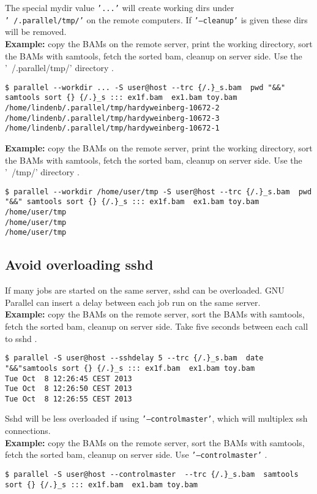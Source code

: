 \documentclass{article}
\newcommand{\example}[1]{
\textbf{Example: } {\color[rgb]{0,0,1} #1 } .
}
\newcommand{\cmdoption}[1]{\texttt{'#1'}}
\begin{document}
The special mydir value \cmdoption{...} will create working dirs under \cmdoption{~/.parallel/tmp/} on the remote computers. If \cmdoption{--cleanup} is given these dirs will be removed.\\

\example{copy the BAMs on the remote server, print the working directory, sort the BAMs with samtools, fetch the sorted bam, cleanup on server side. Use the '~/.parallel/tmp/' directory}
\begin{lstlisting}
$ parallel --workdir ... -S user@host --trc {/.}_s.bam  pwd "&&" samtools sort {} {/.}_s ::: ex1f.bam  ex1.bam toy.bam
/home/lindenb/.parallel/tmp/hardyweinberg-10672-2
/home/lindenb/.parallel/tmp/hardyweinberg-10672-3
/home/lindenb/.parallel/tmp/hardyweinberg-10672-1
\end{lstlisting}

\example{copy the BAMs on the remote server, print the working directory, sort the BAMs with samtools, fetch the sorted bam, cleanup on server side. Use the '~/tmp/' directory}
\begin{lstlisting}
$ parallel --workdir /home/user/tmp -S user@host --trc {/.}_s.bam  pwd "&&" samtools sort {} {/.}_s ::: ex1f.bam  ex1.bam toy.bam
/home/user/tmp
/home/user/tmp
/home/user/tmp
\end{lstlisting}


\subsection{Avoid overloading sshd}
If many jobs are started on the same server, sshd can be overloaded. GNU Parallel can insert a delay between each job run on the same server.\\
\example{copy the BAMs on the remote server, sort the BAMs with samtools, fetch the sorted bam, cleanup on server side. Take five seconds between each call to sshd}
\begin{lstlisting}
$ parallel -S user@host --sshdelay 5 --trc {/.}_s.bam  date "&&"samtools sort {} {/.}_s ::: ex1f.bam  ex1.bam toy.bam
Tue Oct  8 12:26:45 CEST 2013
Tue Oct  8 12:26:50 CEST 2013
Tue Oct  8 12:26:55 CEST 2013
\end{lstlisting}
Sshd will be less overloaded if using \cmdoption{--controlmaster}, which will multiplex ssh connections.\\
\example{copy the BAMs on the remote server, sort the BAMs with samtools, fetch the sorted bam, cleanup on server side. Use \cmdoption{--controlmaster} }
\begin{lstlisting}
$ parallel -S user@host --controlmaster  --trc {/.}_s.bam  samtools sort {} {/.}_s ::: ex1f.bam  ex1.bam toy.bam
\end{lstlisting}
\end{document}
